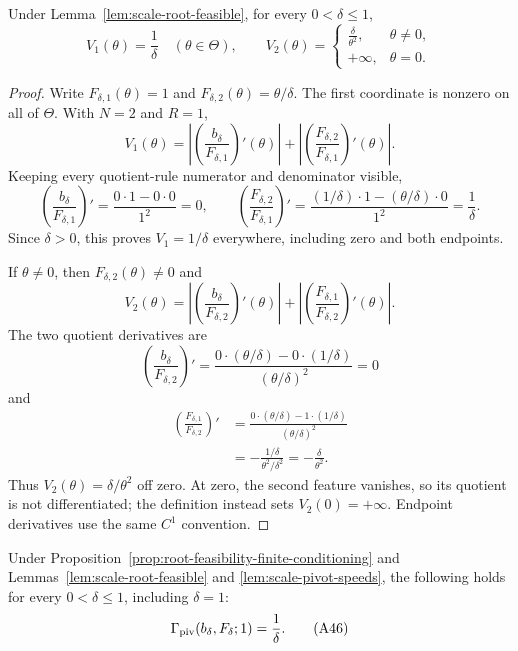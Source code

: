 \begin{lemma}
\label{lem:scale-pivot-speeds}
Under Lemma~\ref{lem:scale-root-feasible}, for every $0<\delta\leq1$,
\[
V_1(\theta)=\frac1\delta\quad(\theta\in\Theta),
\qquad
V_2(\theta)=
\begin{cases}
\displaystyle\frac\delta{\theta^2},&\theta\neq0,\\
+\infty,&\theta=0.
\end{cases}
\tag{A45}\label{eq:a45}
\]
\end{lemma}

\begin{proof}
Write
$F_{\delta,1}(\theta)=1$ and
$F_{\delta,2}(\theta)=\theta/\delta$.  The first coordinate is nonzero on
all of $\Theta$.  With $N=2$ and $R=1$,
\[
V_1(\theta)=
\left|\left(\frac{b_\delta}{F_{\delta,1}}\right)'(\theta)\right|
+\left|\left(\frac{F_{\delta,2}}{F_{\delta,1}}\right)'(\theta)\right|.
\]
Keeping every quotient-rule numerator and denominator visible,
\[
\left(\frac{b_\delta}{F_{\delta,1}}\right)'
=\frac{0\cdot1-0\cdot0}{1^2}=0,
\qquad
\left(\frac{F_{\delta,2}}{F_{\delta,1}}\right)'
=\frac{(1/\delta)\cdot1-(\theta/\delta)\cdot0}{1^2}
=\frac1\delta.
\]
Since $\delta>0$, this proves $V_1=1/\delta$ everywhere, including zero
and both endpoints.

If $\theta\neq0$, then $F_{\delta,2}(\theta)\neq0$ and
\[
V_2(\theta)=
\left|\left(\frac{b_\delta}{F_{\delta,2}}\right)'(\theta)\right|
+\left|\left(\frac{F_{\delta,1}}{F_{\delta,2}}\right)'(\theta)\right|.
\]
The two quotient derivatives are
\[
\left(\frac{b_\delta}{F_{\delta,2}}\right)'
=\frac{0\cdot(\theta/\delta)-0\cdot(1/\delta)}
{(\theta/\delta)^2}=0
\]
and
\[
\begin{aligned}
\left(\frac{F_{\delta,1}}{F_{\delta,2}}\right)'
&=\frac{0\cdot(\theta/\delta)-1\cdot(1/\delta)}
{(\theta/\delta)^2}\\
&=-\frac{1/\delta}{\theta^2/\delta^2}
=-\frac\delta{\theta^2}.
\end{aligned}
\]
Thus $V_2(\theta)=\delta/\theta^2$ off zero.  At zero, the second feature
vanishes, so its quotient is not differentiated; the definition instead
sets $V_2(0)=+\infty$.  Endpoint derivatives use the same $C^1$
convention.
\end{proof}

\begin{proposition}
\label{prop:scale-stress-specialization}
Under Proposition~\ref{prop:root-feasibility-finite-conditioning} and
Lemmas~\ref{lem:scale-root-feasible} and \ref{lem:scale-pivot-speeds}, the
following holds for every $0<\delta\leq1$, including $\delta=1$:
\[
\Gamma_{\rm piv}(b_\delta,F_\delta;1)=\frac1\delta.
\tag{A46}\label{eq:a46}
\]
\end{proposition}

